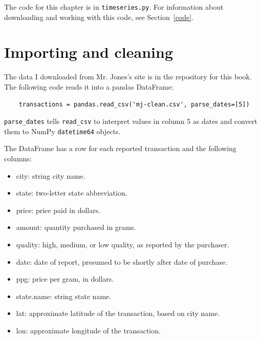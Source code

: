\documentclass[12pt]{book}
\theoremstyle{exercise}
\begin{document}
The code for this chapter is in {\tt timeseries.py}.  For information
about downloading and working with this code, see Section~\ref{code}.


\section{Importing and cleaning}

The data I downloaded from
Mr. Jones's site is in the repository for this book.
The following code reads it into a
pandas DataFrame:%
%

\begin{verbatim}
    transactions = pandas.read_csv('mj-clean.csv', parse_dates=[5])
\end{verbatim}

\verb"parse_dates" tells \verb"read_csv" to interpret values in column 5
as dates and convert them to NumPy {\tt datetime64} objects.%

The DataFrame has a row for each reported transaction and 
the following columns:

\begin{itemize}

\item city: string city name.

\item state: two-letter state abbreviation.

\item price: price paid in dollars.%

\item amount: quantity purchased in grams.

\item quality: high, medium, or low quality, as reported by the purchaser.

\item date: date of report, presumed to be shortly after date of purchase.

\item ppg: price per gram, in dollars.

\item state.name: string state name.

\item lat: approximate latitude of the transaction, based on city name.

\item lon: approximate longitude of the transaction.

\end{itemize}
\end{document}
